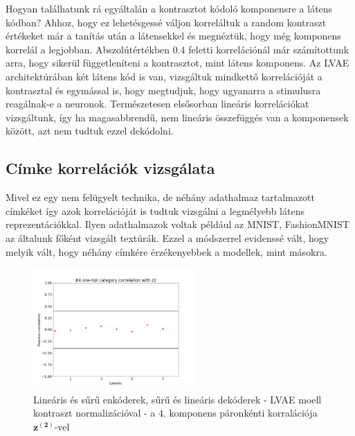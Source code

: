 \documentclass[12pt, english]{article}
\begin{document}
\vspace{4mm}

\par Hogyan találhatunk rá egyáltalán a kontrasztot kódoló komponensre a látens kódban? Ahhoz, hogy ez lehetésgessé váljon korreláltuk a random kontraszt értékeket már a tanítás után a látensekkel és megnéztük, hogy még komponens korrelál a legjobban. Abszolútértékben 0.4 feletti korrelációnál már számítottunk arra, hogy sikerül függetleníteni a kontrasztot, mint látens komponens. Az LVAE architektúrában két látens kód is van, vizsgáltuk mindkettő korrelációját a kontrasztal és egymással is, hogy megtudjuk, hogy ugyanarra a stimulusra reagálnak-e a neuronok. Természetesen elsősorban lineáris korrelációkat vizsgáltunk, így ha magasabbrendű, nem lineáris összefüggés van a komponensek között, azt nem tudtuk ezzel dekódolni.

\vspace{4mm}

\subsection{Címke korrelációk vizsgálata}

\vspace{4mm}

\par Mivel ez egy nem felügyelt technika, de néhány adathalmaz tartalmazott címkéket így azok korrelációját is tudtuk vizsgálni a legmélyebb látens reprezentációkkal. Ilyen adathalmazok voltak például az MNIST, FashionMNIST az általunk főként vizsgált textúrák. Ezzel a módszerrel evidenssé vált, hogy melyik vált, hogy néhány címkére érzékenyebbek a modellek, mint másokra.

\vspace{4mm}

\begin{figure}[H]
    \centering
    \includegraphics[width=0.55\textwidth]{17_DenseLinLinLadderVAE_contrastNorm-cat-4-to-z2-corr.png}
    \caption{Lineáris és sűrű enkóderek, sűrű és lineáris dekóderek - LVAE moell kontraszt normalizációval - a $4.$ komponens páronkénti korralációja $\bm{z^{(2)}}$-vel}
\end{figure}
\end{document}
